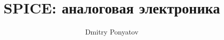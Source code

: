 

\author{Dmitry Ponyatov }
\title{SPICE: аналоговая электроника}



    \maketitle
    \tableofcontents\secdown
    
    
    
    
    

